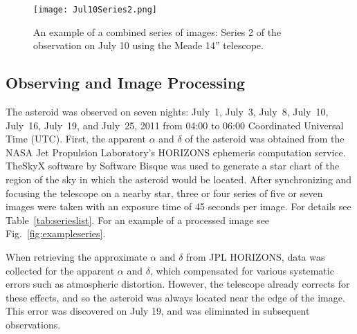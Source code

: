 \documentclass[12pt,journal,compsoc]{IEEEtran}
\begin{document}
\begin{figure}[!t]
\centering
\texttt{[image: Jul10Series2.png]}
\caption{An example of a combined series of images: Series 2 of the observation on July 10 using the Meade 14'' telescope.\label{fig:exampleseries}}
\label{fig_sim}
\end{figure}

\subsection{Observing and Image Processing}
The asteroid was observed on seven nights: July~1, July~3, July~8, July~10, July~16, July~19, and July~25, 2011 
from 04:00 to 06:00 Coordinated Universal Time (UTC).
First, the apparent $\alpha$ and $\delta$ of the asteroid was obtained from the
NASA Jet Propulsion Laboratory's HORIZONS ephemeris computation service.
TheSkyX software by Software Bisque was used to generate a star chart of the region of the sky 
in which the asteroid would be located.
After synchronizing and focusing the telescope on a nearby star, 
three or four series of five or seven images were taken 
with an exposure time of 45 seconds per image. For details see Table~\ref{tab:serieslist}.
For an example of a processed image see Fig.~\ref{fig:exampleseries}.

When retrieving the approximate $\alpha$ and $\delta$ from JPL HORIZONS, 
data was collected for the apparent $\alpha$ and $\delta$,
which compensated for various systematic errors such as atmospheric distortion.
However, the telescope already corrects for these effects, 
and so the asteroid was always located near the edge of the image. 
This error was discovered on July 19, and was eliminated in subsequent observations.
\end{document}
